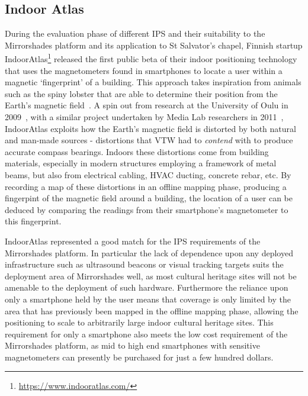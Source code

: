 
\subsection{Indoor Atlas}

During the evaluation phase of different IPS and their suitability to the Mirrorshades platform and its application to St Salvator's chapel, Finnish startup IndoorAtlas\footnote{\url{https://www.indooratlas.com/}} released the first public beta of their indoor positioning technology that uses the magnetometers found in smartphones to locate a user within a magnetic `fingerprint' of a building. This approach takes inspiration from animals such as the spiny lobster that are able to determine their position from the Earth's magnetic field~\cite{Boles2003}. A spin out from research at the University of Oulu in 2009~\cite{Haverinen2009,Haverinen2009a}, with a similar project undertaken by Media Lab researchers in 2011~\cite{Chung2011}, IndoorAtlas exploits how the Earth's magnetic field is distorted by both natural and man-made sources - distortions that VTW had to \textit{contend} with to produce accurate compass bearings. Indoors these distortions come from building materials, especially in modern structures employing a framework of metal beams, but also from electrical cabling, HVAC ducting, concrete rebar, etc. By recording a map of these distortions in an offline mapping phase, producing a fingerpint of the magnetic field around a building, the location of a user can be deduced by comparing the readings from their smartphone's magnetometer to this fingerprint.

IndoorAtlas represented a good match for the IPS requirements of the Mirrorshades platform. In particular the lack of dependence upon any deployed infrastructure such as ultrasound beacons or visual tracking targets suits the deployment area of Mirrorshades well, as most cultural heritage sites will not be amenable to the deployment of such hardware. Furthermore the reliance upon only a smartphone held by the user means that coverage is only limited by the area that has previously been mapped in the offline mapping phase, allowing the positioning to scale to arbitrarily large indoor cultural heritage sites. This requirement for only a smartphone also meets the low cost requirement of the Mirrorshades platform, as mid to high end smartphones with sensitive magnetometers can presently be purchased for just a few hundred dollars.

